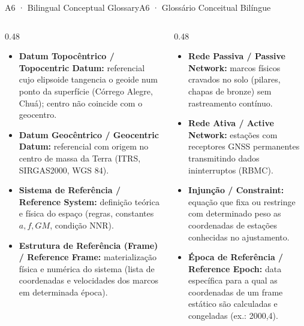 \documentclass[aspectratio=169,11pt]{beamer}
\newcommand{\tr}[2]{\ifEN#2\else#1\fi}
\begin{document}
\begin{frame}{\tr{A6 · Glossário Conceitual Bilíngue}{A6 · Bilingual Conceptual Glossary}}
  \tiny
  \begin{columns}[onlytextwidth]
    \begin{column}{0.48\textwidth}
      \begin{itemize}
        \setlength{\itemsep}{2pt}
        \item \textbf{Datum Topocêntrico / Topocentric Datum:} referencial cujo elipsoide tangencia o geoide num ponto da superfície (Córrego Alegre, Chuá); centro não coincide com o geocentro.
        \item \textbf{Datum Geocêntrico / Geocentric Datum:} referencial com origem no centro de massa da Terra (ITRS, SIRGAS2000, WGS 84).
        \item \textbf{Sistema de Referência / Reference System:} definição teórica e física do espaço (regras, constantes $a, f, GM$, condição NNR).
        \item \textbf{Estrutura de Referência (Frame) / Reference Frame:} materialização física e numérica do sistema (lista de coordenadas e velocidades dos marcos em determinada época).
      \end{itemize}
    \end{column}
    \begin{column}{0.48\textwidth}
      \begin{itemize}
        \setlength{\itemsep}{2pt}
        \item \textbf{Rede Passiva / Passive Network:} marcos físicos cravados no solo (pilares, chapas de bronze) sem rastreamento contínuo.
        \item \textbf{Rede Ativa / Active Network:} estações com receptores GNSS permanentes transmitindo dados ininterruptos (RBMC).
        \item \textbf{Injunção / Constraint:} equação que fixa ou restringe com determinado peso as coordenadas de estações conhecidas no ajustamento.
        \item \textbf{Época de Referência / Reference Epoch:} data específica para a qual as coordenadas de um frame estático são calculadas e congeladas (ex.: 2000,4).
      \end{itemize}
    \end{column}
  \end{columns}
\end{frame}
\end{document}
